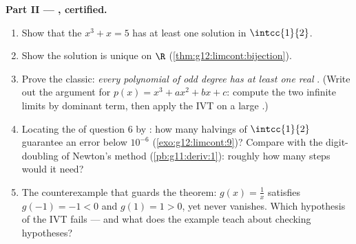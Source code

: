 \begin{problem}
\medskip
\noindent\textbf{Part II --- , certified.}
\begin{enumerate}[resume]
  \item Show that the  $x^3 + x = 5$ has at least one
        solution in $\intcc{1}{2}$.
  \item Show the solution is unique on $\R$
        (\cref{thm:g12:limcont:bijection}).
  \item Prove the classic: \emph{every polynomial of odd degree
        has at least one real }. (Write out the argument
        for $p(x) = x^3 + a x^2 + b x + c$: compute the two
        infinite limits by dominant term, then apply the IVT on
        a large .)
  \item Locating the  of question 6 by : how many
        halvings of $\intcc{1}{2}$ guarantee an error below
        $10^{-6}$ (\cref{exo:g12:limcont:9})? Compare with the
        digit-doubling of Newton's method
        (\cref{pb:g11:deriv:1}): roughly how many steps would
        it need?
  \item The counterexample that guards the theorem:
        $g(x) = \frac1x$ satisfies $g(-1) = -1 < 0$ and
        $g(1) = 1 > 0$, yet never vanishes. Which hypothesis of
        the IVT fails --- and what does the example teach about
        checking hypotheses?
\end{enumerate}


\end{problem}
